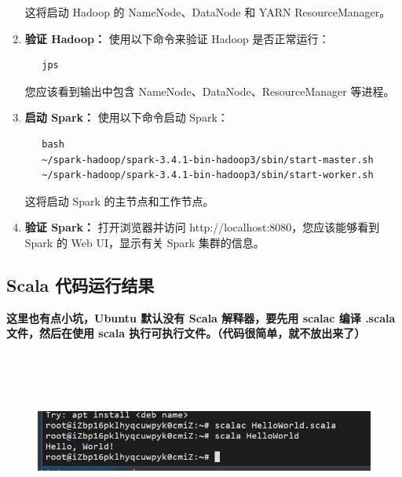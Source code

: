 \documentclass{article}
\begin{document}
\begin{enumerate}
   这将启动 Hadoop 的 NameNode、DataNode 和 YARN ResourceManager。

    \item \textbf{验证 Hadoop：} 使用以下命令来验证 Hadoop 是否正常运行：

    \begin{verbatim}
   jps
    \end{verbatim}

    您应该看到输出中包含 NameNode、DataNode、ResourceManager 等进程。

    \item \textbf{启动 Spark：} 使用以下命令启动 Spark：

    \begin{verbatim}
   bash
   ~/spark-hadoop/spark-3.4.1-bin-hadoop3/sbin/start-master.sh
   ~/spark-hadoop/spark-3.4.1-bin-hadoop3/sbin/start-worker.sh
    \end{verbatim}

   这将启动 Spark 的主节点和工作节点。

    \item \textbf{验证 Spark：} 打开浏览器并访问 http://localhost:8080，您应该能够看到 Spark 的 Web UI，显示有关 Spark 集群的信息。
\end{enumerate}

\subsection*{Scala 代码运行结果}
\textbf{这里也有点小坑，Ubuntu 默认没有 Scala 解释器，要先用 scalac 编译 .scala 文件，然后在使用 scala 执行可执行文件。（代码很简单，就不放出来了）}
\begin{figure}[htbp]
    \centering
    \includegraphics[width=16cm,height=6cm]{firstScala.png}
\end{figure} 
\end{document}
